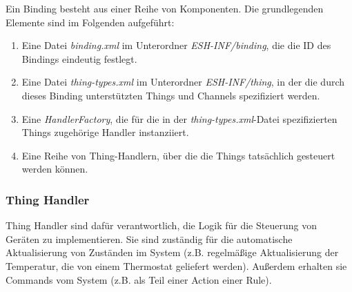 Ein Binding besteht aus einer Reihe von Komponenten. Die grundlegenden Elemente sind im Folgenden aufgeführt:

\begin{enumerate}
\item Eine Datei \textit{binding.xml} im Unterordner \textit{ESH-INF/binding}, die die ID des Bindings eindeutig festlegt.
\item Eine Datei \textit{thing-types.xml} im Unterordner \textit{ESH-INF/thing}, in der die durch dieses Binding unterstützten Things und Channels spezifiziert werden.
\item Eine \textit{HandlerFactory}, die für die in der \textit{thing-types.xml}-Datei spezifizierten Things zugehörige Handler instanziiert.
\item Eine Reihe von Thing-Handlern, über die die Things tatsächlich gesteuert werden können.
\end{enumerate}


\subsubsection{Thing Handler}
Thing Handler sind dafür verantwortlich, die Logik für die Steuerung von Geräten zu implementieren. Sie sind zuständig für die automatische Aktualisierung von Zuständen im System (z.B. regelmäßige Aktualisierung der Temperatur, die von einem Thermostat geliefert werden). Außerdem erhalten sie Commands vom System (z.B. als Teil einer Action einer Rule).








